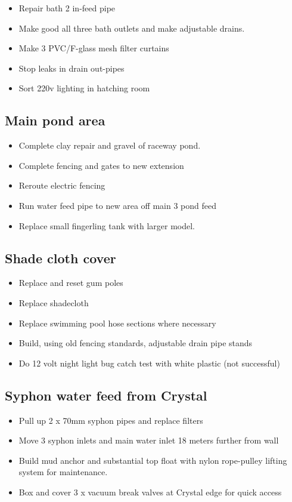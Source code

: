 \begin{itemize}
\item Repair bath 2 in-feed pipe
\item Make good all three bath outlets and make adjustable drains. 
\item Make 3 PVC/F-glass mesh filter curtains  
\item Stop leaks in drain out-pipes
\item Sort 220v lighting in hatching room
\end{itemize}

\subsection{Main pond area}     
\begin{itemize}
\item Complete clay repair and gravel of raceway pond.    
\item Complete fencing and gates to new extension   \checkmark
\item Reroute electric fencing \checkmark
\item Run water feed pipe to new area off main 3 pond feed \checkmark
\item Replace small fingerling tank with larger model.
\end{itemize}

\subsection{Shade cloth cover}  
\begin{itemize}
\item Replace and reset gum poles  \checkmark
\item Replace shadecloth \checkmark 
\item Replace swimming pool hose sections where necessary \checkmark
\item Build, using old fencing standards, adjustable drain pipe stands
\item Do 12 volt night light bug catch test with white plastic \checkmark (not successful)
\end{itemize}


\subsection{Syphon water feed from Crystal}
\begin{itemize}
\item  Pull up 2 x 70mm syphon pipes and replace filters \checkmark
\item Move 3 syphon inlets and main water inlet 18 meters further from wall
\item Build mud anchor and substantial top float with nylon rope-pulley lifting system for maintenance.
\item Box and cover 3 x vacuum break valves at Crystal edge for quick access
\end{itemize}



